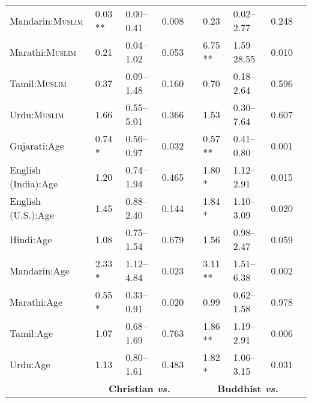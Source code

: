 \begin{table}[ht]
\begin{threeparttable}
\begin{tabular}{lllllllll}
Mandarin:\textsc{Muslim} & 0.03 ** & 0.00--0.41 & 0.008 &  & 0.23 & 0.02--2.77 & 0.248 \\ 
Marathi:\textsc{Muslim} & 0.21 & 0.04--1.02 & 0.053 &  & 6.75 ** & 1.59--28.55 & 0.010 \\ 
Tamil:\textsc{Muslim} & 0.37 & 0.09--1.48 & 0.160 &  & 0.70 & 0.18--2.64 & 0.596 \\ 
Urdu:\textsc{Muslim} & 1.66 & 0.55--5.01 & 0.366 &  & 1.53 & 0.30--7.64 & 0.607 \\ 
Gujarati:Age\tnote{b} & 0.74 * & 0.56--0.97 & 0.032 &  & 0.57 ** & 0.41--0.80 & 0.001 \\ 
English (India):Age\tnote{b} & 1.20 & 0.74--1.94 & 0.465 &  & 1.80 * & 1.12--2.91 & 0.015 \\ 
English (U.S.):Age\tnote{b} & 1.45 & 0.88--2.40 & 0.144 &  & 1.84 * & 1.10--3.09 & 0.020 \\ 
Hindi:Age\tnote{b} & 1.08 & 0.75--1.54 & 0.679 &  & 1.56 & 0.98--2.47 & 0.059 \\ 
Mandarin:Age\tnote{b} & 2.33 * & 1.12--4.84 & 0.023 &  & 3.11 ** & 1.51--6.38 & 0.002 \\ 
Marathi:Age\tnote{b} & 0.55 * & 0.33--0.91 & 0.020 &  & 0.99 & 0.62--1.58 & 0.978 \\ 
Tamil:Age\tnote{b} & 1.07 & 0.68--1.69 & 0.763 &  & 1.86 ** & 1.19--2.91 & 0.006 \\ 
Urdu:Age\tnote{b} & 1.13 & 0.80--1.61 & 0.483 &  & 1.82 * & 1.06--3.15 & 0.031\\
\midrule
& \multicolumn{3}{c}{\textbf{Christian \textit{vs.}}} & &
\multicolumn{3}{c}{\textbf{Buddhist \textit{vs.}}}\\


\end{tabular}
\end{threeparttable}
\end{table}

